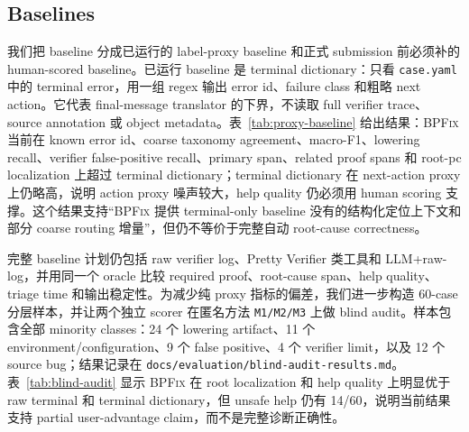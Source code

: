 \documentclass[letterpaper,twocolumn,10pt]{article}
\newcommand{\sys}{\textsc{BPFix}\xspace}
\newcommand{\code}[1]{\texttt{#1}}
\begin{document}
\subsection{Baselines}

我们把 baseline 分成已运行的 label-proxy baseline 和正式 submission 前必须补的 human-scored baseline。已运行 baseline 是 terminal dictionary：只看 \code{case.yaml} 中的 terminal error，用一组 regex 输出 error id、failure class 和粗略 next action。它代表 final-message translator 的下界，不读取 full verifier trace、source annotation 或 object metadata。表~\ref{tab:proxy-baseline} 给出结果：\sys 当前在 known error id、coarse taxonomy agreement、macro-F1、lowering recall、verifier false-positive recall、primary span、related proof spans 和 root-pc localization 上超过 terminal dictionary；terminal dictionary 在 next-action proxy 上仍略高，说明 action proxy 噪声较大，help quality 仍必须用 human scoring 支撑。这个结果支持“\sys 提供 terminal-only baseline 没有的结构化定位上下文和部分 coarse routing 增量”，但仍不等价于完整自动 root-cause correctness。

完整 baseline 计划仍包括 raw verifier log、Pretty Verifier 类工具和 LLM+raw-log，并用同一个 oracle 比较 required proof、root-cause span、help quality、triage time 和输出稳定性。为减少纯 proxy 指标的偏差，我们进一步构造 60-case 分层样本，并让两个独立 scorer 在匿名方法 \code{M1/M2/M3} 上做 blind audit。样本包含全部 minority classes：24 个 lowering artifact、11 个 environment/configuration、9 个 false positive、4 个 verifier limit，以及 12 个 source bug；结果记录在 \code{docs/evaluation/blind-audit-results.md}。表~\ref{tab:blind-audit} 显示 \sys 在 root localization 和 help quality 上明显优于 raw terminal 和 terminal dictionary，但 unsafe help 仍有 14/60，说明当前结果支持 partial user-advantage claim，而不是完整诊断正确性。
\end{document}
